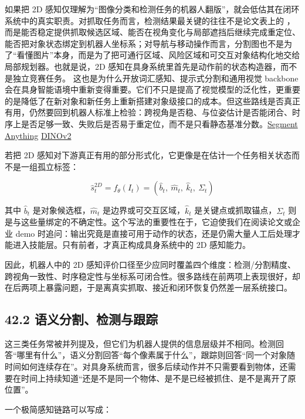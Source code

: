 如果把 2D 感知仅理解为“图像分类和检测任务的机器人翻版”，就会低估其在闭环系统中的真实职责。对抓取任务而言，检测结果最关键的往往不是论文表上的 \texttt{}，而是能否稳定提供抓取候选区域、能否在视角变化与局部遮挡后继续完成重定位、能否把对象状态绑定到机器人坐标系；对导航与移动操作而言，分割图也不是为了“看懂图片”本身，而是为了把可通行区域、风险区域和可交互对象结构化地交给局部规划器。也就是说，2D 感知在具身系统里首先是动作前的状态构造器，而不是独立竞赛任务。 这也是为什么开放词汇感知、提示式分割和通用视觉 backbone 会在具身智能语境中重新变得重要。它们不只是提高了视觉模型的泛化性，更重要的是降低了在新对象和新任务上重新搭建对象级接口的成本。但这些路线是否真正有用，仍然要回到机器人标准上检验：跨视角是否稳、与位姿估计是否能闭合、时序上是否足够一致、失败后是否易于重定位，而不是只看静态基准分数。\href{https://arxiv.org/abs/2304.02643}{Segment Anything} \href{https://arxiv.org/abs/2304.07193}{DINOv2}

若把 2D 感知对下游真正有用的部分形式化，它更像是在估计一个任务相关状态而不是一组孤立标签：

\begingroup
\footnotesize
\begin{equation*}
\hat s_t^{2D}=f_{\theta}(I_t)=(\hat b_t,\ \hat m_t,\ \hat k_t,\ \Sigma_t)
\end{equation*}
\endgroup

其中 \(\hat b_t\) 是对象候选框，\(\hat m_t\) 是边界或可交互区域，\(\hat k_t\) 是关键点或抓取锚点，\(\Sigma_t\) 则是与这些量绑定的不确定性。这个写法的重要性在于，它迫使我们在阅读论文或企业 demo 时追问：输出究竟是直接可用于动作的状态，还是仍需大量人工后处理才能进入技能层。只有前者，才真正构成具身系统中的 2D 感知能力。

因此，机器人中的 2D 感知评价口径至少应同时覆盖四个维度：检测/分割精度、跨视角一致性、时序稳定性与坐标系可闭合性。很多路线在前两项上表现很好，却在后两项上暴露问题，于是离真实抓取、接近和闭环恢复仍然差一层系统接口。

\subsection*{42.2 语义分割、检测与跟踪}


这三类任务常被并列提及，但它们为机器人提供的信息层级并不相同。检测回答“哪里有什么”，语义分割回答“每个像素属于什么”，跟踪则回答“同一个对象随时间如何连续存在”。对具身系统而言，很多后续动作并不只需要看到物体，还需要在时间上持续知道“还是不是同一个物体、是不是已经被抓住、是不是离开了原位置”。

一个极简感知链路可以写成：

